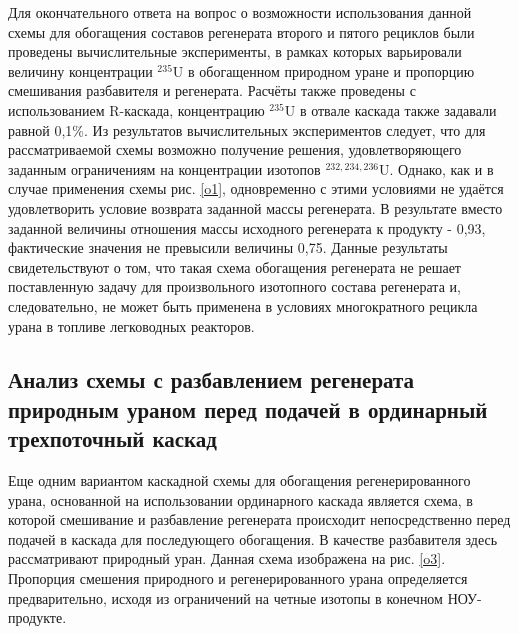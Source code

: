 Для окончательного ответа на вопрос о возможности использования данной схемы для обогащения составов регенерата второго и пятого рециклов были проведены вычислительные эксперименты, в рамках которых варьировали величину концентрации $^{235}$U в обогащенном природном уране и пропорцию смешивания разбавителя и регенерата. Расчёты также проведены с использованием R-каскада, концентрацию $^{235}$U в отвале каскада также задавали равной 0,1\%.
Из результатов вычислительных экспериментов следует, что для рассматриваемой схемы возможно получение решения, удовлетворяющего заданным ограничениям на концентрации изотопов $^{232,234,236}$U. Однако, как и в случае применения схемы рис. \ref{o1}, одновременно с этими условиями не удаётся удовлетворить условие возврата заданной массы регенерата. В результате вместо заданной величины отношения массы исходного регенерата к продукту - 0,93, фактические значения не превысили величины 0,75. Данные результаты свидетельствуют о том, что такая схема обогащения регенерата не решает поставленную задачу для произвольного изотопного состава регенерата и, следовательно, не может быть применена в условиях многократного рецикла урана в топливе легководных реакторов.

\subsection{Анализ схемы с разбавлением регенерата природным ураном перед подачей в ординарный трехпоточный каскад}

Еще одним вариантом каскадной схемы для обогащения регенерированного урана, основанной на использовании ординарного каскада является схема, в которой смешивание и разбавление регенерата происходит непосредственно перед подачей в каскада для последующего обогащения. В качестве разбавителя здесь рассматривают природный уран. Данная схема изображена на рис. \ref{o3}. Пропорция смешения природного и регенерированного урана определяется предварительно, исходя из ограничений на четные изотопы в конечном НОУ-продукте.

